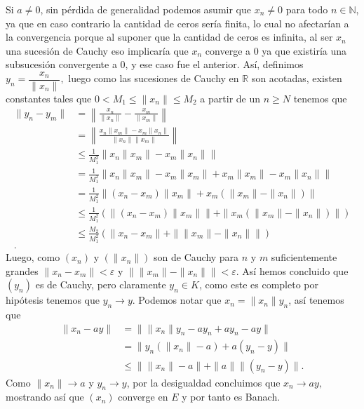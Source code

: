 \begin{sproof}
  Si $a\neq 0$, sin pérdida de generalidad podemos asumir que $x_n\neq 0$ para todo $n\in \mathbb{N}$, ya que en caso contrario la cantidad de ceros sería finita, lo cual no afectarían a la convergencia porque al suponer que la cantidad de ceros es infinita, al ser $x_n$ una sucesión de Cauchy eso implicaría que $x_n$ converge a $0$ ya que existiría una subsucesión convergente a $0$, y ese caso fue el anterior. Así, definimos $y_n=\dfrac{x_n}{\|x_n\|},$ luego como las sucesiones de Cauchy en $\mathbb{R}$ son acotadas, existen constantes tales que $0<M_1\leq\|x_n\|\leq M_2$ a partir de un $n\geq N$ tenemos que   
  \begin{align*}
      \|y_n-y_m\|&=\left\|\frac{x_n}{\|x_n\|}-\frac{x_m}{\|x_m\|}\right\|\\
      &=\left\|\frac{x_n\|x_m\|-x_m\|x_n\|}{\|x_n\|\|x_m\|}\right\|\\
      &\leq\frac{1}{M_1^2}\|x_n\|x_m\|-x_m\|x_n\|\|\\
      &=\frac{1}{M_1^2}\|x_n\|x_m\|-x_m\|x_m\|+x_m\|x_m\|-x_m\|x_n\|\|\\
      &=\frac{1}{M_1^2}\|(x_n-x_m)\|x_m\|+x_m(\|x_m\|-\|x_n\|)\|\\
      &\leq\frac{1}{M_1^2}(\|(x_n-x_m)\|x_m\|\|+\|x_m(\|x_m\|-\|x_n\|)\|)\\
      &\leq\frac{M_2}{M_1^2}(\|x_n-x_m\|+\|\|x_m\|-\|x_n\|\|)\\
  .\end{align*}
  Luego, como $(x_n)$ y $(\|x_n\|)$ son de Cauchy para $n$ y $m$ suficientemente grandes $\|x_n-x_m\|<\varepsilon$ y $\|\|x_m\|-\|x_n\|\|<\varepsilon.$ Así hemos concluido que $(y_n)$ es de Cauchy, pero claramente $y_n\in K$, como este es completo por hipótesis tenemos que $y_n\to y$. Podemos notar que $x_n=\|x_n\|y_n$, así tenemos que
  \begin{align*}
      \|x_n-ay\|&=\|\|x_n\|y_n-ay_n+ay_n-ay\|\\
      &=\|y_n(\|x_n\|-a)+a(y_n-y)\|\\
      &\leq\|\|x_n\|-a\|+\|a\|\|(y_n-y)\|
  .\end{align*}
  Como $\|x_n\|\to a$ y $y_n\to y$, por la desigualdad concluimos que $x_n\to ay,$ mostrando así que $(x_n)$ converge en $E$ y por tanto es Banach.










\end{sproof}